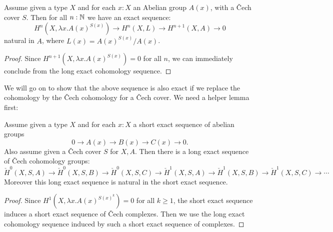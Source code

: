 

\begin{lemma}\label{inductive-definition-cohomology-general}
Assume given a type $X$ and for each $x:X$ an Abelian group $A(x)$, with a \v Cech cover $S$. Then for all $n:\mathbb{N}$ we have an exact sequence:
\[H^{n}(X,\lambda x.A(x)^{S(x)}) \to H^{n}(X,L)\to H^{n+1}(X,A)\to 0\]
natural in $A$, where $L(x) = A(x)^{S(x)}/A(x)$.
\end{lemma}

\begin{proof}
  Since $H^{n+1}(X,\lambda x.A(x)^{S(x)}) = 0$ for all $n$, we can immediately conclude from the long exact cohomology sequence.
\end{proof}

We will go on to show that the above sequence is also exact if we replace the cohomology by the \v Cech cohomology for a \v Cech cover. We need a helper lemma first:

\begin{lemma}\label{long-exact-cech-cohomology-general}
Assume given a type $X$ and for each $x:X$ a short exact sequence of abelian groups
\[0\to A(x)\to B(x)\to C(x)\to 0.\]
Also assume given a \v Cech cover $S$ for $X,A$. 
Then there is a long exact sequence of \v{C}ech cohomology groups:
\[\check{H}^0(X,S,A) \to\check{H}^0(X,S,B) \to\check{H}^0(X,S,C) \to\check{H}^1(X,S,A) \to\check{H}^1(X,S,B) \to\check{H}^1(X,S,C) \to\cdots \]
Moreover this long exact sequence is natural in the short exact sequence.
\end{lemma}

\begin{proof}
  Since $H^1(X,\lambda x.A(x)^{S(x)^k}) = 0$ for all $k\geq 1$,
  the short exact sequence induces a short exact sequence of \v Cech complexes. 
  Then we use the long exact cohomology sequence induced by such a short exact sequence of complexes.
\end{proof}

